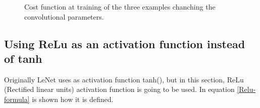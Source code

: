 \begin{figure}[htb]
    \centering

    \caption{Cost function at training of the three examples chanching the convolutional parameters.} \label{fig:LENETLFW_Cost}
\end{figure}



\subsection{Using ReLu as an activation function instead of tanh}
Originally LeNet uses as activation function tanh(), but in this section, ReLu (Rectified linear units) activation function is going to be used. In equation \ref{Relu-formula} is shown how it is defined.  \\

